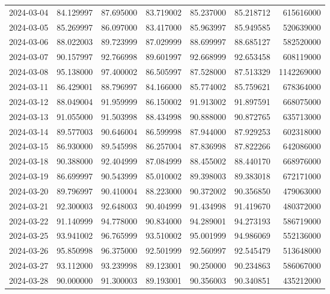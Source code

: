 \begin{tabular}{lrrrrrr}
2024-03-04 &   84.129997 &   87.695000 &   83.719002 &   85.237000 &   85.218712 &   615616000 \\
2024-03-05 &   85.269997 &   86.097000 &   83.417000 &   85.963997 &   85.949585 &   520639000 \\
2024-03-06 &   88.022003 &   89.723999 &   87.029999 &   88.699997 &   88.685127 &   582520000 \\
2024-03-07 &   90.157997 &   92.766998 &   89.601997 &   92.668999 &   92.653458 &   608119000 \\
2024-03-08 &   95.138000 &   97.400002 &   86.505997 &   87.528000 &   87.513329 &  1142269000 \\
2024-03-11 &   86.429001 &   88.796997 &   84.166000 &   85.774002 &   85.759621 &   678364000 \\
2024-03-12 &   88.049004 &   91.959999 &   86.150002 &   91.913002 &   91.897591 &   668075000 \\
2024-03-13 &   91.055000 &   91.503998 &   88.434998 &   90.888000 &   90.872765 &   635713000 \\
2024-03-14 &   89.577003 &   90.646004 &   86.599998 &   87.944000 &   87.929253 &   602318000 \\
2024-03-15 &   86.930000 &   89.545998 &   86.257004 &   87.836998 &   87.822266 &   642086000 \\
2024-03-18 &   90.388000 &   92.404999 &   87.084999 &   88.455002 &   88.440170 &   668976000 \\
2024-03-19 &   86.699997 &   90.543999 &   85.010002 &   89.398003 &   89.383018 &   672171000 \\
2024-03-20 &   89.796997 &   90.410004 &   88.223000 &   90.372002 &   90.356850 &   479063000 \\
2024-03-21 &   92.300003 &   92.648003 &   90.404999 &   91.434998 &   91.419670 &   480372000 \\
2024-03-22 &   91.140999 &   94.778000 &   90.834000 &   94.289001 &   94.273193 &   586719000 \\
2024-03-25 &   93.941002 &   96.765999 &   93.510002 &   95.001999 &   94.986069 &   552136000 \\
2024-03-26 &   95.850998 &   96.375000 &   92.501999 &   92.560997 &   92.545479 &   513648000 \\
2024-03-27 &   93.112000 &   93.239998 &   89.123001 &   90.250000 &   90.234863 &   586067000 \\
2024-03-28 &   90.000000 &   91.300003 &   89.193001 &   90.356003 &   90.340851 &   435212000 \\

\end{tabular}

